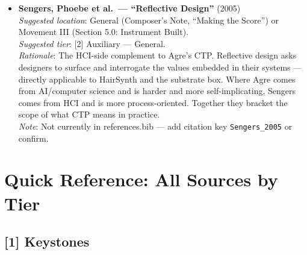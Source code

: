 \begin{itemize}
    \item \textbf{Sengers, Phoebe et al.\ — ``Reflective Design''} (2005)\\
    \textit{Suggested location}: General (Composer's Note, ``Making the Score'') or Movement III (Section 5.0: Instrument Built).\\
    \textit{Suggested tier}: [2] Auxiliary — General.\\
    \textit{Rationale}: The HCI-side complement to Agre's CTP. Reflective design asks designers to surface and interrogate the values embedded in their systems — directly applicable to HairSynth and the substrate box. Where Agre comes from AI/computer science and is harder and more self-implicating, Sengers comes from HCI and is more process-oriented. Together they bracket the scope of what CTP means in practice.\\
    \textit{Note}: Not currently in references.bib — add citation key \texttt{Sengers\_2005} or confirm.

\end{itemize}

\bigskip


\section*{Quick Reference: All Sources by Tier}

\subsection*{[1] Keystones}


